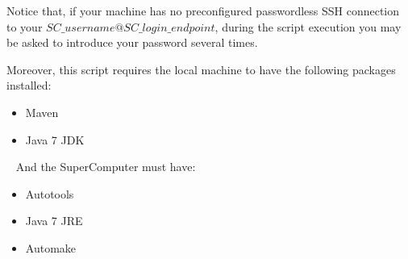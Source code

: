 Notice that, if your machine has no preconfigured passwordless SSH connection to your $SC\_username@SC\_login\_endpoint$,
during the script execution you may be asked to introduce your password several times. 
\newline

Moreover, this script requires the local machine to have the following packages installed:
\begin{itemize}
 \item Maven
 \item Java 7 JDK
\end{itemize}

~ \newline
And the SuperComputer must have:
\begin{itemize}
 \item Autotools
 \item Java 7 JRE
 \item Automake
\end{itemize}


